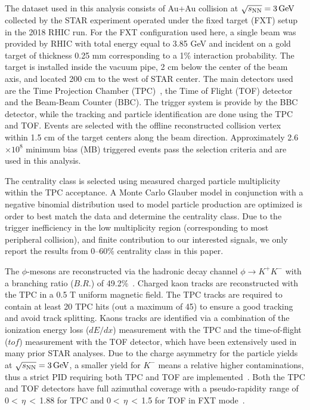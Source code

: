 \documentclass[%
 reprint,	
showpacs,
 amsmath,amssymb,
 aps,
 prc,
]{revtex4-1}
\begin{document}
The dataset used in this analysis consists of Au+Au collision at ${\sqrt{s_{\rm NN}} = \rm{3\,GeV}}$ collected by the STAR experiment operated under the fixed target (FXT) setup in the 2018 RHIC run. For the FXT configuration used here, a single beam was provided by RHIC with total energy equal to 3.85 GeV and incident on a gold target of thickness 0.25 mm corresponding to a 1\% interaction probability.
The target is installed inside the vacuum pipe, 2 cm below the center of the beam axis, and located 200 cm to the west of STAR center. The main detectors used are the Time Projection Chamber (TPC)~\cite{TPC}, the Time of Flight (TOF) detector~\cite{TOF} and the Beam-Beam Counter (BBC). The trigger system is provide by the BBC detector, while the tracking and particle identification are done using the TPC and TOF. Events are selected with the offline reconstructed collision vertex within 1.5 cm of the target centers along the beam direction. Approximately 2.6$\times 10^{8}$ minimum bias (MB) triggered events pass the selection criteria and are used in this analysis. 

The centrality class is selected using measured charged particle multiplicity within the TPC acceptance. 
A Monte Carlo Glauber model in conjunction with a negative binomial distribution used to model particle production are optimized is order to best match the data and determine the centrality class. Due to the trigger inefficiency in the low multiplicity region (corresponding to most peripheral collision), and finite contribution to our interested signals, we only report the results from 0--60\% centrality class in this paper.

The $\phi$-mesons are reconstructed via the hadronic decay channel $\phi\rightarrow K^+K^-$ with a branching ratio ($B.R.$) of 49.2\%~\cite{pdg}. Charged kaon tracks are reconstructed with the TPC in a 0.5 T uniform magnetic field. The TPC tracks are required to contain at least 20 TPC hits (out a maximum of 45) to ensure a good tracking and avoid track splitting. Kaons tracks are identified via a combination of the ionization energy loss ($dE/dx$) measurement with the TPC and the time-of-flight ($tof$) measurement with the TOF detector, which have been extensively used in many prior STAR analyses. Due to the charge asymmetry for the particle yields at ${\sqrt{s_{\rm NN}} = \rm{3\,GeV}}$, a smaller yield for $K^-$ means a relative higher contaminations, thus a strict PID requiring both TPC and TOF are implemented~\cite{Xu:2008th,Shao:2005iu}. Both the TPC and TOF detectors have full azimuthal coverage with a pseudo-rapidity range of 0$<$\,$\eta$\,$<$\,1.88 for TPC and 0$<$\,$\eta$\,$<$\,1.5 for TOF in FXT mode~\cite{TPC,TOF}.
\end{document}

